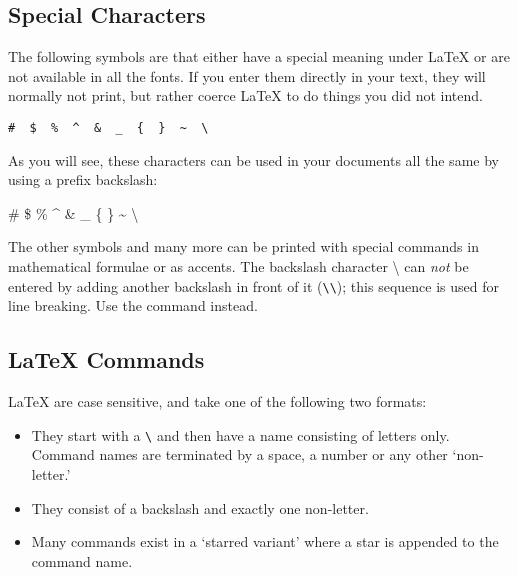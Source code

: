 \subsection{Special Characters}

The following symbols are  that either have a
special meaning under \LaTeX{} or are not available in all the fonts.
If you enter them directly in your text, they will normally not print,
but rather coerce \LaTeX{} to do things you did not intend. 
\begin{code}
\verb.#  $  %  ^  &  _  {  }  ~  \ . %
\end{code}

As you will see, these characters can be used in your documents all
the same by using a prefix backslash:

\begin{example}
\# \$ \% \^{} \& \_ \{ \} \~{}
\textbackslash
\end{example}

The other symbols and many more can be printed with special commands
in mathematical formulae or as accents. The backslash character
\textbackslash{} can \emph{not} be entered by adding another backslash
in front of it (\verb|\\|); this sequence is used for
line breaking. Use the  command instead.

\subsection{\LaTeX{} Commands}

\LaTeX{}  are case sensitive, and take one of the following
two formats:

\begin{itemize}
\item They start with a  \verb|\| and then have a name
 consisting of letters only. Command names are terminated by a
 space, a number or any other `non-letter.'
\item They consist of a backslash and exactly one non-letter.
\item Many commands exist in a `starred variant' where a star is appended
to the command name.
\end{itemize}

%
%

%
%
\label{whitespace}

